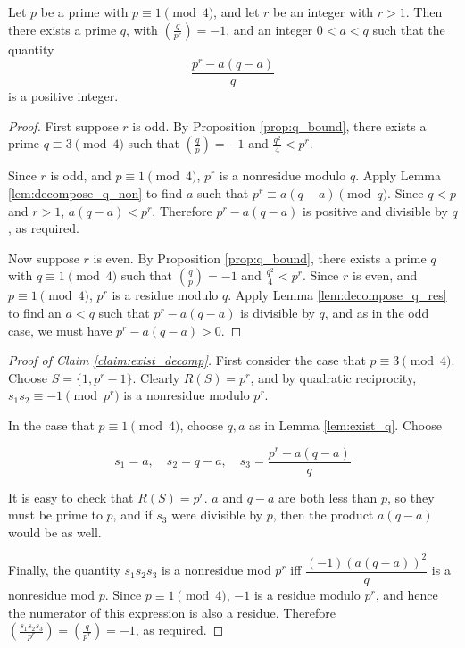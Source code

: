\documentclass{amsart}
\begin{document}
\begin{lem}
  \label{lem:exist_q}
  Let $p$ be a prime with $p \equiv 1 \pmod 4$, and let $r$ be an
  integer with $r > 1$. Then there exists a prime $q$, with $\left(
    \frac{q}{p^r} \right) = -1$, and an integer $0 < a < q$ such that
  the quantity
  \[\frac{p^r - a(q-a)}{q}\] 
  is a positive integer.
\end{lem}
\begin{proof}
  First suppose $r$ is odd. By Proposition \ref{prop:q_bound}, there
  exists a prime $q \equiv 3 \pmod 4$ such that $\left( \frac{q}{p}
  \right) = -1$ and $\frac{q^2}{4} < p^r$.

  Since $r$ is odd, and $p \equiv 1 \pmod 4$, $p^r$ is a nonresidue
  modulo $q$. Apply Lemma \ref{lem:decompose_q_non} to find $a$ such
  that $p^r \equiv a(q-a) \pmod q$. Since $q < p$ and $r > 1$,
  $a(q-a) < p^r$. Therefore $p^r - a(q-a)$ is positive and divisible
  by $q$, as required.

  Now suppose $r$ is even. By Proposition \ref{prop:q_bound}, there
  exists a prime $q$ with $q \equiv 1 \pmod 4$ such that $\left(
    \frac{q}{p} \right) = -1$ and $\frac{q^2}{4} < p^r$. Since $r$ is
  even, and $p \equiv 1 \pmod 4$, $p^r$ is a residue modulo $q$. Apply
  Lemma \ref{lem:decompose_q_res} to find an $a < q$ such that $p^r -
  a(q-a)$ is divisible by $q$, and as in the odd case, we must have
  $p^r - a(q-a) > 0$.
\end{proof}

\begin{proof}[Proof of Claim \ref{claim:exist_decomp}]
  First consider the case that $p \equiv 3 \pmod 4$. Choose $S = \{1,
  p^r-1\}$. Clearly $R(S) = p^r$, and by quadratic reciprocity,
  $s_1s_2 \equiv -1 \pmod {p^r}$ is a nonresidue modulo $p^r$.

  In the case that $p \equiv 1 \pmod 4$, choose $q,a$ as in
  Lemma \ref{lem:exist_q}. Choose

  \[s_1 = a, \quad s_2 =  q-a, \quad s_3 = \frac{p^r - a(q-a)}{q}\]

  It is easy to check that $R(S) = p^r$. $a$ and $q-a$ are both less
  than $p$, so they must be prime to $p$, and if $s_3$ were divisible
  by $p$, then the product $a(q-a)$ would be as well.

  Finally, the quantity $s_1s_2s_3$ is a nonresidue mod $p^r$ iff
  $\dfrac{(-1)(a(q-a))^2}{q}$ is a nonresidue mod $p$. Since $p \equiv
  1 \pmod 4$, $-1$ is a residue modulo $p^r$, and hence the numerator
  of this expression is also a residue. Therefore $\left(
    \frac{s_1s_2s_3}{p^r} \right) = \left( \frac{q}{p^r} \right) =
  -1$, as required.
\end{proof}
\end{document}
